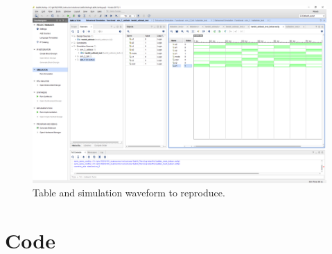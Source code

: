 \documentclass[11pt]{article}
\newcommand{\Verilog}[2][]{%
	
}
\begin{document}
\begin{figure}[ht]\centering
	\includegraphics[width=1\textwidth, trim= 19cm 15cm 0.5cm 4cm, clip]{lab1_example_screenshot.PNG}
	\caption{Table and simulation waveform to reproduce.}
	\label{fig:original_logo}
\end{figure}


\section*{Code}

\Verilog{lab1_example_code.sv}
\end{document}
